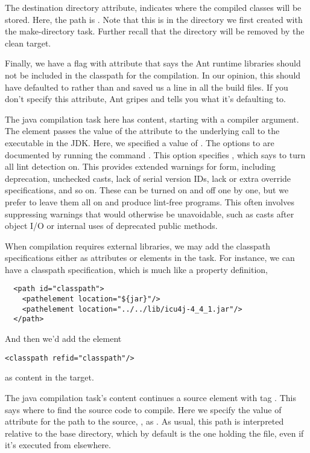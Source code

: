 The destination directory attribute,  indicates where
the compiled classes will be stored.  Here, the path is .
Note that this is in the directory we first created with the
make-directory task.  Further recall that the  directory
will be removed by the clean target.

Finally, we have a flag with attribute  that
says the Ant runtime libraries should not be included in the classpath
for the compilation.  In our opinion, this should have defaulted to
 rather than  and saved us a line in all the
build files.  If you don't specify this attribute, Ant gripes and
tells you what it's defaulting to.

The java compilation task here has content, starting with a compiler
argument.  The element  passes the value of the
attribute  to the underlying call to the 
executable in the JDK.  Here, we specified a value of 
.  The  options to  are
documented by running the command .  This 
option specifies , which says to turn all lint
detection on.  This provides extended warnings for form, including
deprecation, unchecked casts, lack of serial version IDs, lack or
extra override specifications, and so on.  These can be turned on and
off one by one, but we prefer to leave them all on and produce
lint-free programs.  This often involves suppressing warnings that
would otherwise be unavoidable, such as casts after object I/O or
internal uses of deprecated public methods.

When compilation requires external libraries, we may add the classpath
specifications either as attributes or elements in the 
task.  For instance, we can have a classpath specification, which
is much like a property definition,

\begin{verbatim}
  <path id="classpath">
    <pathelement location="${jar}"/>
    <pathelement location="../../lib/icu4j-4_4_1.jar"/>
  </path>
\end{verbatim}
%
And then we'd add the element 
%
\begin{verbatim}
<classpath refid="classpath"/>
\end{verbatim}
%
as content in the  target.

The java compilation task's content continues a source element with
tag .  This says where to find the source code to compile.
Here we specify the value of attribute for the path to the source,
, as .  As usual, this path is interpreted
relative to the base directory, which by default is the one holding
the  file, even if it's executed from elsewhere.

